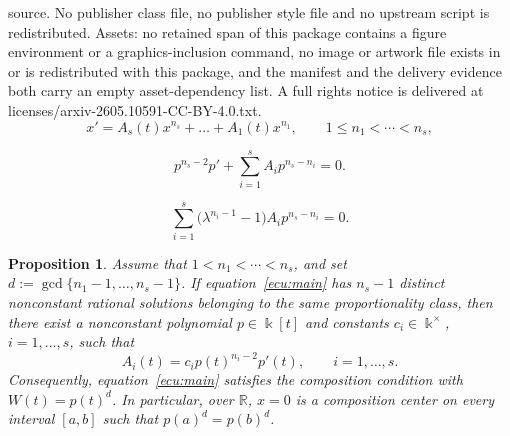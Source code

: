 \documentclass[10pt,a4paper]{amsart}
\numberwithin{theorem}{section}
\newtheorem{proposition}[theorem]{Proposition}
\theoremstyle{definition}
\begin{document}
source. No publisher class file, no publisher style file and no upstream script is redistributed. Assets: no retained span of this package contains a figure environment or a graphics-inclusion command, no image or artwork file exists in or is redistributed with this package, and the manifest and the delivery evidence both carry an empty asset-dependency list. A full rights notice is delivered at licenses/arxiv-2605.10591-CC-BY-4.0.txt.
	\begin{equation}\label{ecu:main}
		x'=A_s(t)x^{n_s}+\dots+A_1(t)x^{n_1},
		\qquad 1\leq n_1<\cdots<n_s,
	\end{equation}

		\begin{equation}\label{eq:denominator}
			p^{n_s-2}p'+\sum_{i=1}^s A_i p^{n_s-n_i}=0.
		\end{equation}

\setcounter{equation}{4}
		\begin{equation}\label{eq:scaled-condition}
			\sum_{i=1}^s\bigl(\lambda^{n_i-1}-1\bigr)A_i p^{n_s-n_i}=0.
		\end{equation}

\setcounter{section}{3}
\setcounter{theorem}{12}
	\begin{proposition}\label{prop:composition}
		Assume that $1<n_1<\cdots<n_s$, and set $d:=\gcd\{n_1-1,\ldots,n_s-1\}$. If equation~\eqref{ecu:main} has $n_s-1$ distinct nonconstant rational solutions belonging to the same proportionality class, then there exist a nonconstant polynomial $p\in\Bbbk[t]$ and constants $c_i\in\Bbbk^\times$, $i=1,\ldots,s$, such that
		\[
		A_i(t)=c_i p(t)^{n_i-2}p'(t),\qquad i=1,\ldots,s.
		\]
		Consequently, equation~\eqref{ecu:main} satisfies the composition condition with $W(t)=p(t)^d$. In particular, over $\mathbb{R}$, $x=0$ is a composition center on every interval $[a,b]$ such that $p(a)^d=p(b)^d$.
	\end{proposition}
\end{document}
